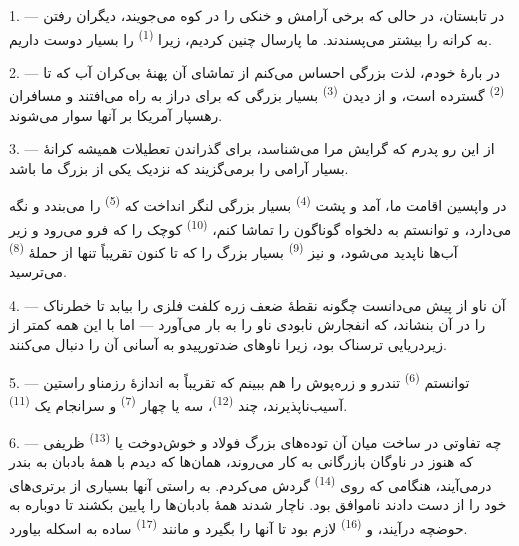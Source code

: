 \VUsaut{4.0mm}
\VUsaut{3.0mm}
\VUsaut{3.0mm}

1. --- در تابستان، در حالی که برخی آرامش و خنکی را در کوه می‌جویند،
دیگران رفتن به کرانه را بیشتر می‌پسندند. ما پارسال چنین کردیم، زیرا
 \textsuperscript{(1)} را بسیار دوست داریم.

2. --- در بارهٔ خودم، لذت بزرگی احساس می‌کنم از تماشای آن پهنهٔ بی‌کران
آب که تا  \textsuperscript{(2)} گسترده است، و از دیدن
 \textsuperscript{(3)} بسیار بزرگی که برای
 دراز به راه می‌افتند و مسافران رهسپار آمریکا بر آنها سوار
می‌شوند.

3. --- از این رو پدرم که گرایش مرا می‌شناسد، برای گذراندن تعطیلات همیشه
کرانهٔ بسیار آرامی را برمی‌گزیند که نزدیک یکی از  بزرگ ما باشد.

در واپسین اقامت ما،  آمد و پشت 
\textsuperscript{(4)} بسیار بزرگی لنگر انداخت که 
\textsuperscript{(5)} را می‌بندد و نگه می‌دارد، و توانستم به دلخواه
 گوناگون را تماشا کنم، 
\textsuperscript{(10)} کوچک را که فرو می‌رود و زیر آب‌ها ناپدید
می‌شود، و نیز  \textsuperscript{(9)} بسیار بزرگ را که
تا کنون تقریباً تنها از حملهٔ 
\textsuperscript{(8)} می‌ترسید.

\VUsaut{3.0mm}
\VUsaut{3.0mm}

4. --- آن ناو از پیش می‌دانست چگونه  نقطهٔ ضعف زره
کلفت فلزی را بیابد تا  خطرناک را در آن بنشاند، که
انفجارش نابودی ناو را به بار می‌آورد — اما با این همه کمتر از
زیردریایی ترسناک بود، زیرا ناوهای ضدتورپیدو به آسانی آن را دنبال
می‌کنند.

5. --- توانستم  \textsuperscript{(6)} تندرو و
زره‌پوش را هم ببینم که تقریباً به اندازهٔ رزمناو راستین آسیب‌ناپذیرند،
چند  \textsuperscript{(12)}، سه یا چهار
 \textsuperscript{(7)} و سرانجام یک
 \textsuperscript{(11)}. 

6. --- چه تفاوتی در ساخت میان آن توده‌های بزرگ فولاد و
 خوش‌دوخت یا 
\textsuperscript{(13)} ظریفی که هنوز در ناوگان بازرگانی به کار
می‌روند، همان‌ها که دیدم با همهٔ بادبان به بندر درمی‌آیند، هنگامی که
روی  \textsuperscript{(14)} گردش می‌کردم. به راستی آنها
بسیاری از برتری‌های خود را از دست دادند 
 ناموافق بود. ناچار شدند همهٔ بادبان‌ها را پایین بکشند تا
دوباره به حوضچه درآیند، و  \textsuperscript{(16)} لازم
بود تا آنها را بگیرد و مانند 
\textsuperscript{(17)} ساده به اسکله بیاورد.

